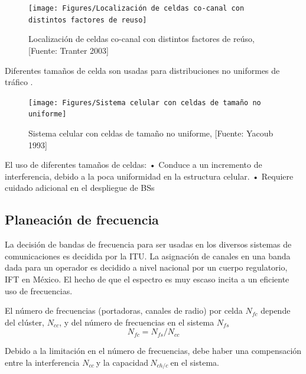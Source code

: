 \begin{figure}[th]
\centering
\texttt{[image: Figures/Localización de celdas co-canal con distintos factores de reuso]}
\decoRule
\caption[Localización de celdas co-canal con distintos factores de reúso]{Localización de celdas co-canal con distintos factores de reúso, [Fuente: Tranter 2003]}
\label{fig:celdascocanal}
\end{figure}

Diferentes tamaños de celda son usadas para distribuciones no uniformes de tráfico \parencite{TurjmanSmallCells}.\newline

\begin{figure}[th]
\centering
\texttt{[image: Figures/Sistema celular con celdas de tamaño no uniforme]}
\decoRule
\caption[Sistema celular con celdas de tamaño no uniforme]{Sistema celular con celdas de tamaño no uniforme, [Fuente: Yacoub 1993]}
\label{fig:nouniformcells}
\end{figure}

El uso de diferentes tamaños de celdas:\newline
•	Conduce a un incremento de interferencia, debido a la poca uniformidad en la estructura celular.\newline
•	Requiere cuidado adicional en el despliegue de BSs\newline

\subsection{Planeación de frecuencia}
La decisión de bandas de frecuencia para ser usadas en los diversos sistemas de comunicaciones es decidida por la ITU. La asignación de canales en una banda dada para un operador es decidido a nivel nacional por un cuerpo regulatorio, IFT en México. El hecho de que el espectro es muy escaso incita a un eficiente uso de frecuencias.\newline

El número de frecuencias (portadoras, canales de radio) por celda $N_{fc}$ depende del clúster, $N_{cc}$, y del número de frecuencias en el sistema $N_{fs}$
\begin{equation}
    N_{fc}={N_{fs}}/{N_{cc}}
    \label{eqn:Nfc}
\end{equation}

Debido a la limitación en el número de frecuencias, debe haber una compensación entre la interferencia $N_{cc}\ $y la capacidad$\ N_{ch/c}\ $en el sistema.\newline

